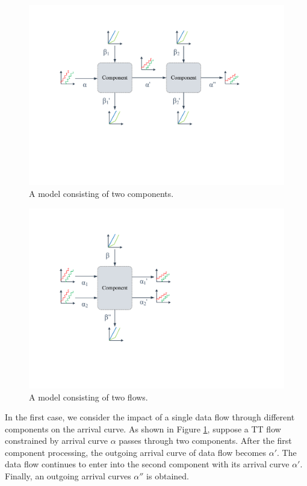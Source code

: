 \documentclass[electronics,article,accept,moreauthors,pdftex]{Definitions/mdpi}
\begin{document}
\begin{figure}[H]

\centering
\includegraphics[scale=0.3]{figures/fig1}
\centering
\caption{A model consisting of two components.}
\label{fig1}
\end{figure}
\begin{figure}[H]
\centering
\includegraphics[scale=0.3]{figures/fig2}
\centering
\caption{A model consisting of two flows.}
\label{fig2}
\end{figure}

In the first case, we consider the impact of a single data flow through different components on the arrival curve.
As shown in {Figure} \ref{fig1}, suppose a TT flow constrained by arrival curve $\alpha$ passes through two components. After the first component processing, the outgoing arrival curve of data flow becomes $\alpha'$. The data flow continues to enter into the second component with its arrival curve $\alpha'$. Finally, an outgoing arrival curves $\alpha''$ is obtained.
\end{document}
